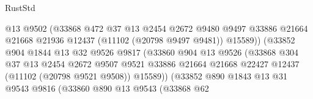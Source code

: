 \begin{lexlean}{RustStd}
\begin{coremodule}
                                      @13
                                      @9502
                                      (@33868
                                        @472
                                        @37
                                        @13
                                        @2454
                                        @2672
                                        @9480
                                        @9497
                                        @33886
                                        @21664
                                        @21668
                                        @21936
                                        @12437
                                        (@11102 (@20798 @9497 @9481))
                                        @15589))
                                    (@33852
                                      @904
                                      @1844
                                      @13
                                      @32
                                      @9526
                                      @9817
                                      (@33860
                                        @904
                                        @13
                                        @9526
                                        (@33868
                                          @304
                                          @37
                                          @13
                                          @2454
                                          @2672
                                          @9507
                                          @9521
                                          @33886
                                          @21664
                                          @21668
                                          @22427
                                          @12437
                                          (@11102 (@20798 @9521 @9508))
                                          @15589))
                                      (@33852
                                        @890
                                        @1843
                                        @13
                                        @31
                                        @9543
                                        @9816
                                        (@33860
                                          @890
                                          @13
                                          @9543
                                          (@33868
                                            @62

\end{coremodule}
\end{lexlean}
